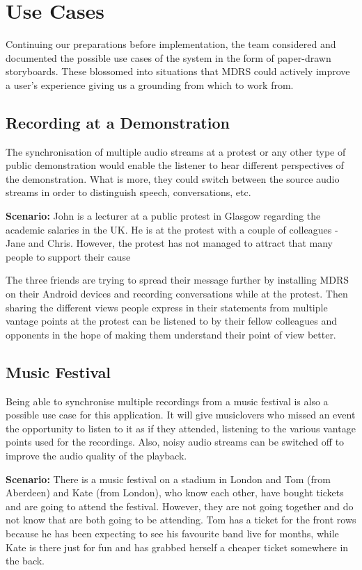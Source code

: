\documentclass{l3proj}
\begin{document}
\section{Use Cases}
Continuing our preparations before implementation, the team considered and documented the possible use cases of the system in the form of paper-drawn storyboards. These blossomed into situations that MDRS could actively improve a user's experience giving us a grounding from which to work from.

\subsection{Recording at a Demonstration} The synchronisation of multiple audio streams at a protest or any other type of public demonstration would enable the listener to hear different perspectives of the demonstration. What is more, they could switch between the source audio streams in order to distinguish speech, conversations, etc.

\textbf{Scenario:} John is a lecturer at a public protest in Glasgow regarding the academic salaries in the UK. He is at the protest with a couple of colleagues - Jane and Chris. However, the protest has not managed to attract that many people to support their cause

The three friends are trying to spread their message further by installing MDRS on their Android devices and recording conversations while at the protest. Then sharing the different views people express in their statements from multiple vantage points at the protest can be listened to by their fellow colleagues and opponents in the hope of making them understand their point of view better.

\subsection{Music Festival} Being able to synchronise multiple recordings from a music festival is also a possible use case for this application. It will give musiclovers who missed an event the opportunity to listen to it as if they attended, listening to the various vantage points used for the recordings. Also, noisy audio streams can be switched off to improve the audio quality of the playback.

\textbf{Scenario:} There is a music festival on a stadium in London and Tom (from Aberdeen) and Kate (from London), who know each other, have bought tickets and are going to attend the festival. However, they are not going together and do not know that are both going to be attending. Tom has a ticket for the front rows because he has been expecting to see his favourite band live for months, while Kate is there just for fun and has grabbed herself a cheaper ticket somewhere in the back.
\end{document}
